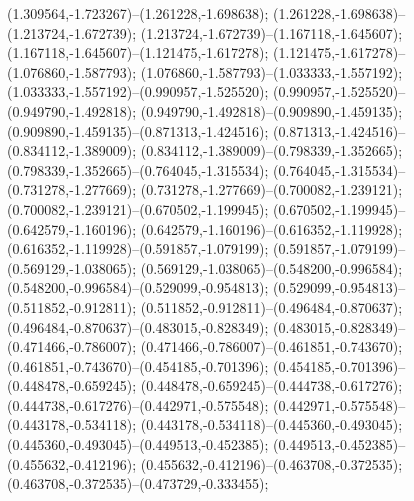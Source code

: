  (1.309564,-1.723267)--(1.261228,-1.698638);
 (1.261228,-1.698638)--(1.213724,-1.672739);
 (1.213724,-1.672739)--(1.167118,-1.645607);
 (1.167118,-1.645607)--(1.121475,-1.617278);
 (1.121475,-1.617278)--(1.076860,-1.587793);
 (1.076860,-1.587793)--(1.033333,-1.557192);
 (1.033333,-1.557192)--(0.990957,-1.525520);
 (0.990957,-1.525520)--(0.949790,-1.492818);
 (0.949790,-1.492818)--(0.909890,-1.459135);
 (0.909890,-1.459135)--(0.871313,-1.424516);
 (0.871313,-1.424516)--(0.834112,-1.389009);
 (0.834112,-1.389009)--(0.798339,-1.352665);
 (0.798339,-1.352665)--(0.764045,-1.315534);
 (0.764045,-1.315534)--(0.731278,-1.277669);
 (0.731278,-1.277669)--(0.700082,-1.239121);
 (0.700082,-1.239121)--(0.670502,-1.199945);
 (0.670502,-1.199945)--(0.642579,-1.160196);
 (0.642579,-1.160196)--(0.616352,-1.119928);
 (0.616352,-1.119928)--(0.591857,-1.079199);
 (0.591857,-1.079199)--(0.569129,-1.038065);
 (0.569129,-1.038065)--(0.548200,-0.996584);
 (0.548200,-0.996584)--(0.529099,-0.954813);
 (0.529099,-0.954813)--(0.511852,-0.912811);
 (0.511852,-0.912811)--(0.496484,-0.870637);
 (0.496484,-0.870637)--(0.483015,-0.828349);
 (0.483015,-0.828349)--(0.471466,-0.786007);
 (0.471466,-0.786007)--(0.461851,-0.743670);
 (0.461851,-0.743670)--(0.454185,-0.701396);
 (0.454185,-0.701396)--(0.448478,-0.659245);
 (0.448478,-0.659245)--(0.444738,-0.617276);
 (0.444738,-0.617276)--(0.442971,-0.575548);
 (0.442971,-0.575548)--(0.443178,-0.534118);
 (0.443178,-0.534118)--(0.445360,-0.493045);
 (0.445360,-0.493045)--(0.449513,-0.452385);
 (0.449513,-0.452385)--(0.455632,-0.412196);
 (0.455632,-0.412196)--(0.463708,-0.372535);
 (0.463708,-0.372535)--(0.473729,-0.333455);
